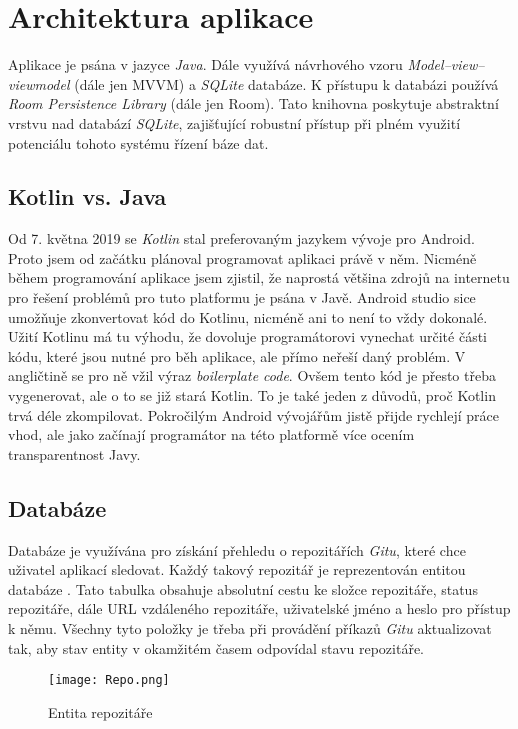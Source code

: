 \section{Architektura aplikace}
Aplikace je psána v jazyce \emph{Java}. Dále využívá návrhového vzoru \emph{Model–view–viewmodel} (dále jen MVVM) a \emph{SQLite} databáze. K přístupu k databázi používá \emph{Room Persistence Library} (dále jen Room). Tato knihovna poskytuje abstraktní vrstvu nad databází \emph{SQLite}, zajišťující robustní přístup při plném využití potenciálu tohoto systému řízení báze dat.

    \subsection{Kotlin vs. Java}
    Od 7. května 2019 se \emph{Kotlin} stal preferovaným jazykem vývoje pro Android. Proto jsem od začátku plánoval programovat aplikaci právě v něm. Nicméně během programování aplikace jsem zjistil, že naprostá většina zdrojů na internetu pro řešení problémů pro tuto platformu je psána v Javě. Android studio sice umožňuje zkonvertovat kód do Kotlinu, nicméně ani to není to vždy dokonalé. Užití Kotlinu má tu výhodu, že dovoluje programátorovi vynechat určité části kódu, které jsou nutné pro běh aplikace, ale přímo neřeší daný problém. V angličtině se pro ně vžil výraz \emph{boilerplate code}. Ovšem tento kód je přesto třeba vygenerovat, ale o to se již stará Kotlin. To je také jeden z důvodů, proč Kotlin trvá déle zkompilovat. Pokročilým Android vývojářům jistě přijde rychlejí práce vhod, ale jako začínají programátor na této platformě více ocením transparentnost Javy.

    \newpage
    \subsection{Databáze}
    Databáze je využívána pro získání přehledu o repozitářích \emph{Gitu}, které chce uživatel aplikací sledovat. Každý takový repozitář je reprezentován entitou databáze . Tato tabulka obsahuje absolutní cestu ke složce repozitáře, status repozitáře, dále URL vzdáleného repozitáře, uživatelské jméno a heslo pro přístup k němu. Všechny tyto položky je třeba při provádění příkazů \emph{Gitu} aktualizovat tak, aby stav entity v okamžitém časem odpovídal stavu repozitáře.

    \begin{figure}[h!]
        \centering
        \vspace{0.5cm}
        \texttt{[image: Repo.png]}
        \caption{Entita repozitáře}
        \label{RepoTable}
    \end{figure}

